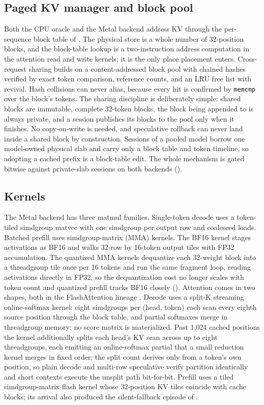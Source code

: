 \documentclass[sigconf,nonacm,screen]{acmart}
\newcommand{\code}[1]{\texttt{\small #1}}
\begin{document}
\subsection{Paged KV manager and block pool}
\label{sec:impl-paged}
Both the CPU oracle and the Metal backend address KV through the per-sequence
block table of . The physical store is a whole number of
32-position blocks, and the block-table lookup is a two-instruction address
computation in the attention read and write kernels; it is the only place
placement enters. Cross-request sharing builds on a content-addressed block
pool with chained hashes verified by exact token comparison, reference
counts, and an LRU free list with revival. Hash collisions can never alias,
because every hit is confirmed by \code{memcmp} over the block's tokens. The
sharing discipline is deliberately simple: shared blocks are immutable,
complete 32-token blocks, the block being appended to is always private, and
a session publishes its blocks to the pool only when it finishes. No
copy-on-write is needed, and speculative rollback can never land inside a
shared block by construction. Sessions of a pooled model borrow one
model-owned physical slab and carry only a block table and token timeline,
so adopting a cached prefix is a block-table edit. The whole mechanism is
gated bitwise against private-slab sessions on both backends
().

\subsection{Kernels}
\label{sec:impl-kernels}
The Metal backend has three matmul families. Single-token decode uses a
token-tiled simdgroup matvec with one simdgroup per output row and coalesced
loads. Batched prefill uses simdgroup-matrix (MMA) kernels. The BF16 kernel
stages activations as BF16 and walks 32-row by 16-token output tiles with
FP32 accumulation. The quantized MMA kernels dequantize each 32-weight block
into a threadgroup tile once per 16 tokens and run the same fragment loop,
reading activations directly in FP32, so the dequantization cost no longer
scales with token count and quantized prefill tracks BF16 closely
(). Attention comes in two shapes, both in the
FlashAttention lineage
\citep{dao2022flashattention,dao2023flashdecoding}. Decode uses a split-K
streaming online-softmax kernel: eight simdgroups per (head, token) each
scan every eighth source position through the block table, and partial
softmaxes merge in threadgroup memory; no score matrix is materialized.
Past 1{,}024 cached positions the kernel additionally splits each head's
KV scan across up to eight threadgroups, each emitting an online-softmax
partial that a small reduction kernel merges in fixed order; the split
count derives only from a token's own position, so plain decode and
multi-row speculative verify partition identically and short contexts
execute the unsplit path bit-for-bit.
Prefill uses a tiled simdgroup-matrix flash kernel whose 32-position KV
tiles coincide with cache blocks; its arrival also produced the
silent-fallback episode of .
\end{document}
